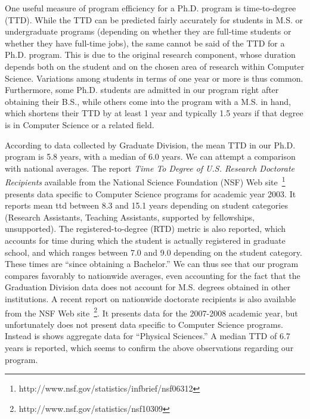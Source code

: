 \documentclass[12pt]{article}
\begin{document}
One useful measure of program efficiency for a Ph.D. program is
time-to-degree (TTD).  While the TTD can be predicted fairly accurately for
students in M.S. or undergraduate programs (depending on whether they are full-time
students or whether they have full-time jobs), the same cannot be said
of the TTD for a Ph.D. program. This is due to the original research
component, whose duration depends both on the student and on the
chosen area of research within Computer Science. Variations among
students in terms of one year or more is thus common. Furthermore,
some Ph.D.  students are admitted in our program right after obtaining
their B.S., while others come into the program with a M.S. in hand,
which shortens their TTD by at least 1 year and typically 1.5 years if
that degree is in Computer Science or a related field.

According to data collected by Graduate Division, the mean TTD in our
Ph.D. program is 5.8 years, with a median of 6.0 years. We can attempt
a comparison with national averages. The report \emph{Time
To Degree of U.S. Research Doctorate Recipients} available from the
National Science Foundation (NSF) Web
site~\footnote{http://www.nsf.gov/statistics/infbrief/nsf06312}
presents data specific to Computer Science programs for academic year
2003. It reports mean ttd between 8.3 and 15.1 years depending on
student categories (Research Assistants, Teaching Assistants,
supported by fellowships, unsupported). The registered-to-degree (RTD)
metric is also reported, which accounts for time during which the
student is actually registered in graduate school, and which ranges
between 7.0 and 9.0 depending on the student category. These times are
``since obtaining a Bachelor.'' We can thus see that our program
compares favorably to nationwide averages, even accounting for the
fact that the Graduation Division data does not account for M.S.
degrees obtained in other institutions.  A recent report on nationwide
doctorate recipients is also available from the NSF Web
site~\footnote{http://www.nsf.gov/statistics/nsf10309}. It presents
data for the 2007-2008 academic year, but unfortunately does not
present data specific to Computer Science programs. Instead is shows
aggregate data for ``Physical Sciences.'' A median TTD of 6.7 years is
reported, which seems to confirm the above observations regarding our program.
\end{document}
